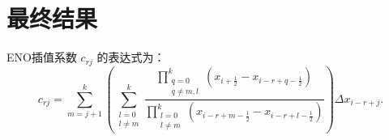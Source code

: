 \documentclass{ctexart}
\begin{document}
\section{最终结果}
ENO插值系数 $c_{rj}$ 的表达式为：
\begin{equation}
c_{rj} = \sum_{m=j+1}^{k} \left( \sum_{\substack{l=0 \\ l \neq m}}^{k} \frac{\prod_{\substack{q=0 \\ q \neq m,l}}^{k} \left( x_{i+\frac{1}{2}} - x_{i - r + q - \frac{1}{2}} \right)}{\prod_{\substack{l=0 \\ l \neq m}}^{k} \left( x_{i - r + m - \frac{1}{2}} - x_{i - r + l - \frac{1}{2}} \right)} \right) \Delta x_{i - r + j}.
\end{equation}
\end{document}

